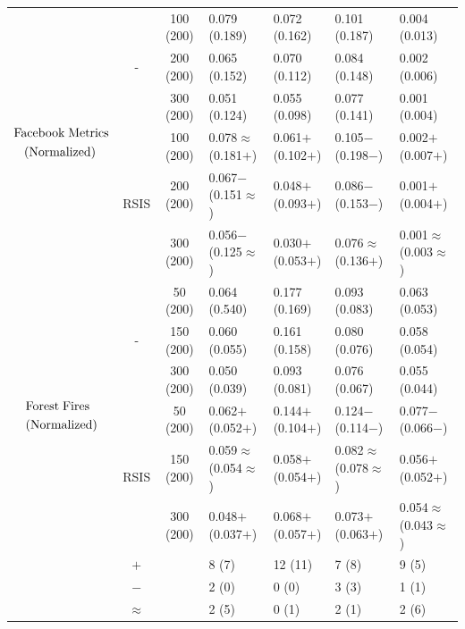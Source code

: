 \documentclass[lettersize,journal]{IEEEtran}
\begin{document}
\begin{table}[!t]
\begin{tabularx}{\textwidth}{cccXXXX}
  \cmidrule{1-7}
  \multirow{6}{*}{$\begin{aligned}&\text{Facebook\;Metrics}\\&\;\;\;\text{(Normalized)} \end{aligned}$} & \multirow{3}{*}{-} & 100 (200) & 0.079 (0.189) & 0.072 (0.162) & 0.101 (0.187) & 0.004 (0.013) \\
    &  & 200 (200) & 0.065 (0.152) & 0.070 (0.112) & 0.084 (0.148) & 0.002 (0.006) \\
    &  & 300 (200) & 0.051 (0.124) & 0.055 (0.098) & 0.077 (0.141) & 0.001 (0.004) \\
  \cmidrule{2-7}
    & \multirow{3}{*}{RSIS} & 100 (200) & 0.078$\approx$ (0.181$+$) & 0.061$+$ (0.102$+$) & 0.105$-$ (0.198$-$) & 0.002$+$ (0.007$+$) \\
    &  & 200 (200) & 0.067$-$ (0.151$\approx$) & 0.048$+$ (0.093$+$) & 0.086$-$ (0.153$-$) & 0.001$+$ (0.004$+$) \\
    &  & 300 (200) & 0.056$-$ (0.125$\approx$) & 0.030$+$ (0.053$+$) & 0.076$\approx$ (0.136$+$) & 0.001$\approx$ (0.003$\approx$) \\
  \cmidrule{1-7}
  \multirow{6}{*}{$\begin{aligned}&\text{Forest\;Fires}\\&\text{(Normalized)}\end{aligned}$} & \multirow{3}{*}{-} & 50 (200) & 0.064 (0.540) & 0.177 (0.169) & 0.093 (0.083) & 0.063 (0.053) \\
    &  & 150 (200) & 0.060 (0.055) & 0.161 (0.158) & 0.080 (0.076) & 0.058 (0.054) \\
    &  & 300 (200) & 0.050 (0.039) & 0.093 (0.081) & 0.076 (0.067) & 0.055 (0.044) \\
  \cmidrule{2-7} 
    & \multirow{3}{*}{RSIS} & 50 (200) & 0.062$+$ (0.052$+$) & 0.144$+$ (0.104$+$) & 0.124$-$ (0.114$-$) & 0.077$-$ (0.066$-$) \\
    &  & 150 (200) & 0.059$\approx$ (0.054$\approx$) & 0.058$+$ (0.054$+$) & 0.082$\approx$ (0.078$\approx$) & 0.056$+$ (0.052$+$) \\
    &  & 300 (200) & 0.048$+$ (0.037$+$) & 0.068$+$ (0.057$+$) & 0.073$+$ (0.063$+$) & 0.054$\approx$ (0.043$\approx$) \\
  \cmidrule{1-7}
    & $+$ &  & 8 (7) & 12 (11) & 7 (8) & 9 (5) \\
    & $-$ &  & 2 (0) & 0 (0) & 3 (3) & 1 (1) \\
    & $\approx$ &  & 2 (5) & 0 (1) & 2 (1) & 2 (6) \\
  \bottomrule
  \end{tabularx}
\end{table}
\end{document}
